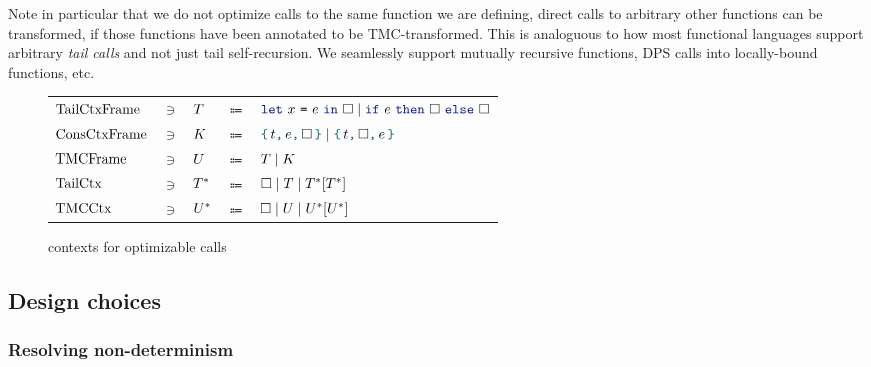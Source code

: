 Note in particular that we do not optimize calls to the same function we are defining, direct calls to arbitrary other functions can be transformed, if those functions have been annotated to be TMC-transformed.
This is analoguous to how most functional languages support arbitrary \emph{tail calls} and not just tail self-recursion.
We seamlessly support mutually recursive functions, DPS calls into locally-bound functions, etc.

\begin{figure}[tp]
    \begin{tabular}{lclcl}
            $\datalangTailFrame[]$
            & $\ni$ &
            $\datalangTailFrame$
            & $\Coloneqq$ &
            $\datalangLet {\datalangVar} {\datalangExpr} \datalangCtxHole \mid \datalangIf \datalangExpr \datalangCtxHole \datalangCtxHole$
\\
            $\datalangConsFrame[]$
            & $\ni$ &
            $\datalangConsFrame$
            & $\Coloneqq$ &
            $\datalangBlock \datalangTag \datalangExpr \datalangCtxHole
            \mid \datalangBlock \datalangTag \datalangCtxHole \datalangExpr$
\\
            $\datalangTMCFrame[]$
            & $\ni$ &
            $\datalangTMCFrame$
            & $\Coloneqq$ &
            $\datalangTailFrame
             \mid
             \datalangConsFrame$
\\
            $\datalangTailCtx[]$
            & $\ni$ &
            $\datalangTailCtx$
            & $\Coloneqq$ &
            $\datalangCtxHole
             \mid
             \datalangTailFrame
             \mid
             \datalangTailCtx{[\datalangTailCtx]}$
\\
            $\datalangTMCCtx[]$
            & $\ni$ &
            $\datalangTMCCtx$
            & $\Coloneqq$ &
            $\datalangCtxHole
             \mid
             \datalangTMCFrame
             \mid
             \datalangTMCCtx{[\datalangTMCCtx]}$
    \end{tabular}
    \caption{\DataLang contexts for optimizable calls}
    \label{fig:contexts}
\end{figure}

\subsection{Design choices}

\subsubsection{Resolving non-determinism}

